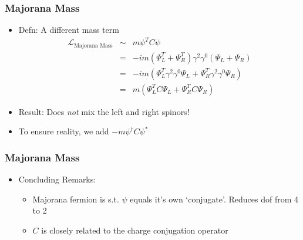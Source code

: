 \documentclass{beamer}
\begin{document}
 
\begin{frame}
	\frametitle{Majorana Mass}
		\begin{itemize}

		\item Defn: A different mass term
		\pause
\[
\begin{alignedat}{2}\mathcal{L}_{\text{Majorana Mass}} & \sim & m\psi^{T}C\psi\\
 & = & -im\left(\Psi_{L}^{T}+\Psi_{R}^{T}\right)\gamma^{2}\gamma^{0}\left(\Psi_{L}+\Psi_{R}\right)\\
 & = & -im\left(\Psi_{L}^{T}\gamma^{2}\gamma^{0}\Psi_{L}+\Psi_{R}^{T}\gamma^{2}\gamma^{0}\Psi_{R}\right)\\
 & = & m\left(\Psi_{L}^{T}C\Psi_{L}+\Psi_{R}^{T}C\Psi_{R}\right)
\end{alignedat}
\]
\pause
		\item Result: Does \emph{not} mix the left and right spinors!
		\pause
		\item To ensure reality, we add $-m\psi^{\dagger}C\psi^{*}$

	\end{itemize}
\end{frame}

 









 
\begin{frame}
	\frametitle{Majorana Mass}
	\begin{itemize}
		\item Concluding Remarks:
		\begin{itemize}
			\item Majorana fermion is s.t. $\psi$ equals it's own `conjugate'. \pause Reduces dof from 4 to 2
			\pause
			\item $C$ is closely related to the charge conjugation operator
		\end{itemize}



	\end{itemize}
\end{frame}

 
\end{document}
